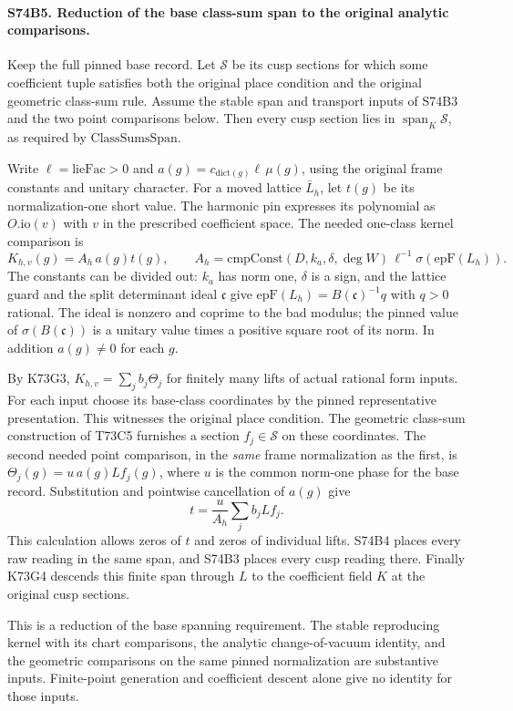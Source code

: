 \paragraph{S74B5. Reduction of the base class-sum span to the original analytic comparisons.}
Keep the full pinned base record. Let $\mathcal S$ be its cusp
sections for which some coefficient tuple satisfies both the original
place condition and the original geometric class-sum rule. Assume
the stable span and transport inputs of S74B3 and the two point
comparisons below. Then every cusp section lies in
$\operatorname{span}_K\mathcal S$, as required by
$\mathrm{ClassSumsSpan}$.

Write $\ell=\mathrm{lieFac}>0$ and
$a(g)=c_{\mathrm{dict}(g)}\ell\,\mu(g)$, using the original frame
constants and unitary character. For a moved lattice $\bar L_h$,
let $t(g)$ be its normalization-one short value. The harmonic pin
expresses its polynomial as $O.\mathrm{io}(v)$ with $v$ in the
prescribed coefficient space. The needed one-class kernel comparison
is
\[
     K_{h,v}(g)=A_h\,a(g)t(g),\qquad
 A_h=\mathrm{cmpConst}(D,k_a,\delta,\deg W)\,
         \ell^{-1}\sigma(\mathrm{epF}(L_h)).
\]
The constants can be divided out: $k_a$ has norm one, $\delta$ is a
sign, and the lattice guard and the split determinant ideal
$\mathfrak c$ give
$\mathrm{epF}(L_h)=B(\mathfrak c)^{-1}q$ with $q>0$ rational.
The ideal is nonzero and coprime to the bad modulus; the pinned value
of $\sigma(B(\mathfrak c))$ is a unitary value times a positive
square root of its norm. In addition $a(g)\ne0$ for each $g$.

By K73G3, $K_{h,v}=\sum_j b_j\Theta_j$ for finitely many lifts of
actual rational form inputs. For each input choose its base-class
coordinates by the pinned representative presentation. This witnesses
the original place condition. The geometric class-sum construction of T73C5
furnishes a section $f_j\in\mathcal S$ on these coordinates.
The second needed point comparison, in the \emph{same} frame
normalization as the first, is $\Theta_j(g)=u\,a(g)Lf_j(g)$,
where $u$ is the common norm-one phase for the base record. Substitution
and pointwise cancellation of $a(g)$ give
\[
       t=\frac{u}{A_h}\sum_j b_j Lf_j .
\]
This calculation allows zeros of $t$ and zeros of individual lifts.
S74B4 places every raw reading in the same span, and S74B3 places
every cusp reading there. Finally K73G4 descends this finite span
through $L$ to the coefficient field $K$ at the original cusp
sections.

This is a reduction of the base spanning requirement. The stable
reproducing kernel with its chart comparisons, the analytic
change-of-vacuum identity, and the geometric comparisons on the same
pinned normalization are substantive inputs. Finite-point generation
and coefficient descent alone give no identity for those inputs.
